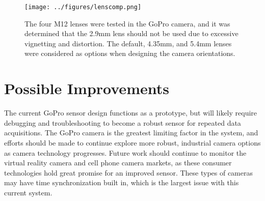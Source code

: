 	\begin{figure}[H]
		\centering
		\texttt{[image: ../figures/lenscomp.png]}
		\caption{The four M12 lenses were tested in the GoPro camera, and it was determined that the 2.9mm lens should not be used due to excessive vignetting and distortion.  The default, 4.35mm, and 5.4mm lenses were considered as options when designing the camera orientations.}
		\label{fig:lenscomp}
	\end{figure}

	\section{Possible Improvements}
	The current GoPro sensor design functions as a prototype, but will likely require debugging and troubleshooting to become a robust sensor for repeated data acquisitions.  The GoPro camera is the greatest limiting factor in the system, and efforts should be made to continue explore more robust, industrial camera options as camera technology progresses.  Future work should continue to monitor the virtual reality camera and cell phone camera markets, as these consumer technologies hold great promise for an improved sensor.  These types of cameras may have time synchronization built in, which is the largest issue with this current system.